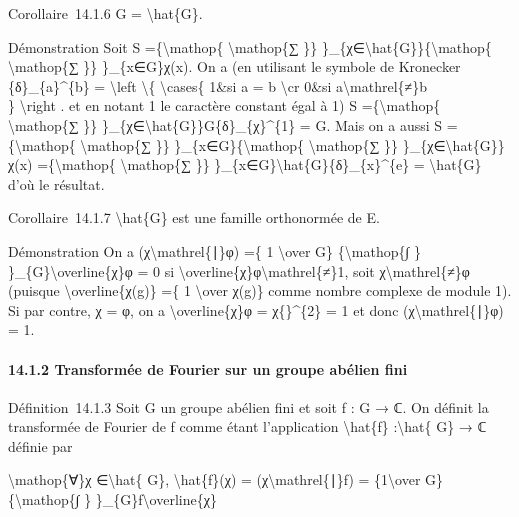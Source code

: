 \documentclass[]{article}
\begin{document}
Corollaire~14.1.6 \textbar{}G\textbar{} =
\textbar{}\textbackslash{}hat\{G\}\textbar{}.

Démonstration Soit S =\{\textbackslash{}mathop\{
\textbackslash{}mathop\{∑ \}\}
\}\_\{χ∈\textbackslash{}hat\{G\}\}\{\textbackslash{}mathop\{
\textbackslash{}mathop\{∑ \}\} \}\_\{x∈G\}χ(x). On a (en utilisant le
symbole de Kronecker \{δ\}\_\{a\}\^{}\{b\} = \textbackslash{}left
\textbackslash{}\{ \textbackslash{}cases\{ 1\&si a = b
\textbackslash{}cr 0\&si a\textbackslash{}mathrel\{≠\}b\\ \}
\textbackslash{}right . et en notant 1 le caractère constant égal à 1) S
=\{\textbackslash{}mathop\{ \textbackslash{}mathop\{∑ \}\}
\}\_\{χ∈\textbackslash{}hat\{G\}\}\textbar{}G\textbar{}\{δ\}\_\{χ\}\^{}\{1\}
= \textbar{}G\textbar{}. Mais on a aussi S =\{\textbackslash{}mathop\{
\textbackslash{}mathop\{∑ \}\} \}\_\{x∈G\}\{\textbackslash{}mathop\{
\textbackslash{}mathop\{∑ \}\} \}\_\{χ∈\textbackslash{}hat\{G\}\}χ(x)
=\{\textbackslash{}mathop\{ \textbackslash{}mathop\{∑ \}\}
\}\_\{x∈G\}\textbar{}\textbackslash{}hat\{G\}\textbar{}\{δ\}\_\{x\}\^{}\{e\}
= \textbar{}\textbackslash{}hat\{G\}\textbar{} d'où le résultat.

Corollaire~14.1.7 \textbackslash{}hat\{G\} est une famille orthonormée
de E.

Démonstration On a (χ\textbackslash{}mathrel\{∣\}φ) =\{ 1
\textbackslash{}over \textbar{}G\textbar{}\} \{\textbackslash{}mathop\{∫
\} \}\_\{G\}\textbackslash{}overline\{χ\}φ = 0 si
\textbackslash{}overline\{χ\}φ\textbackslash{}mathrel\{≠\}1, soit
χ\textbackslash{}mathrel\{≠\}φ (puisque \textbackslash{}overline\{χ(g)\}
=\{ 1 \textbackslash{}over χ(g)\} comme nombre complexe de module 1). Si
par contre, χ = φ, on a \textbackslash{}overline\{χ\}φ =
\textbar{}χ\{\textbar{}\}\^{}\{2\} = 1 et donc
(χ\textbackslash{}mathrel\{∣\}φ) = 1.

\paragraph{14.1.2 Transformée de Fourier sur un groupe abélien fini}

Définition~14.1.3 Soit G un groupe abélien fini et soit f : G → ℂ. On
définit la transformée de Fourier de f comme étant l'application
\textbackslash{}hat\{f\} :\textbackslash{}hat\{ G\} → ℂ définie par

\textbackslash{}mathop\{∀\}χ ∈\textbackslash{}hat\{ G\},
\textbackslash{}hat\{f\}(χ) = (χ\textbackslash{}mathrel\{∣\}f) =
\{1\textbackslash{}over
\textbar{}G\textbar{}\}\{\textbackslash{}mathop\{∫ \}
\}\_\{G\}f\textbackslash{}overline\{χ\}
\end{document}
